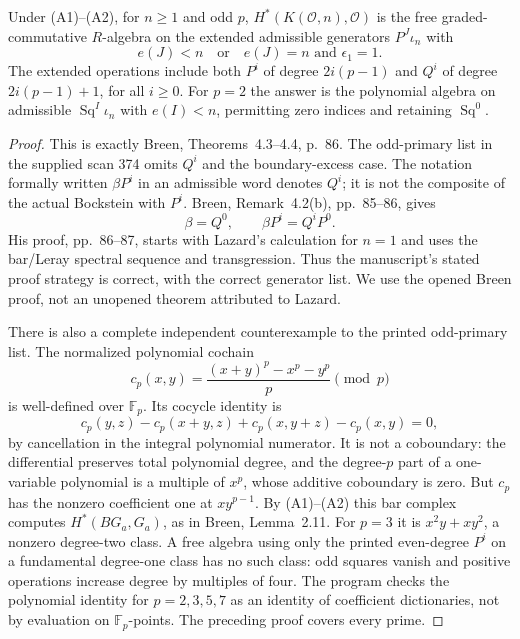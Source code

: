 \begin{theorem}\label{sa08:D015}
Under (A1)--(A2), for $n\geq1$ and odd $p$,
$H^*(K(\mathcal O,n),\mathcal O)$ is the free graded-commutative
$R$-algebra on the extended admissible generators $P^J\iota_n$
with
\[
 e(J)<n\quad\text{or}\quad e(J)=n\text{ and }\epsilon_1=1.
\]
The extended operations include both $P^i$ of degree $2i(p-1)$
and $Q^i$ of degree $2i(p-1)+1$, for all $i\geq0$.
For $p=2$ the answer is the polynomial algebra on admissible
$\operatorname{Sq}^I\iota_n$ with $e(I)<n$, permitting zero
indices and retaining $\operatorname{Sq}^0$.
\end{theorem}
\begin{proof}
This is exactly Breen, Theorems~4.3--4.4, p.~86. The odd-primary
list in the supplied scan 374 omits $Q^i$ and the boundary-excess
case. The notation formally written $\beta P^i$ in an admissible
word denotes $Q^i$; it is not the composite of the actual
Bockstein with $P^i$. Breen, Remark~4.2(b), pp.~85--86, gives
\[
 \beta=Q^0,\qquad \beta P^i=Q^iP^0.
\]
His proof, pp.~86--87, starts with Lazard's calculation for $n=1$
and uses the bar/Leray spectral sequence and transgression. Thus
the manuscript's stated proof strategy is correct, with the
correct generator list. We use the opened Breen proof, not an
unopened theorem attributed to Lazard.

There is also a complete independent counterexample to the printed
odd-primary list. The normalized polynomial cochain
\[
 c_p(x,y)=\frac{(x+y)^p-x^p-y^p}{p}\pmod p
\]
is well-defined over $\mathbb F_p$. Its cocycle identity is
\[
 c_p(y,z)-c_p(x+y,z)+c_p(x,y+z)-c_p(x,y)=0,
\]
by cancellation in the integral polynomial numerator. It is not a
coboundary: the differential preserves total polynomial degree,
and the degree-$p$ part of a one-variable polynomial is a multiple
of $x^p$, whose additive coboundary is zero. But $c_p$ has the
nonzero coefficient one at $xy^{p-1}$. By (A1)--(A2) this bar
complex computes $H^*(BG_a,G_a)$, as in Breen, Lemma~2.11.
For $p=3$ it is $x^2y+xy^2$, a nonzero degree-two class.
A free algebra using only the printed even-degree $P^i$ on a
fundamental degree-one class has no such class: odd squares vanish
and positive operations increase degree by multiples of four.
The program checks the polynomial identity for $p=2,3,5,7$ as
an identity of coefficient dictionaries, not by evaluation on
$\mathbb F_p$-points. The preceding proof covers every prime.
\end{proof}

